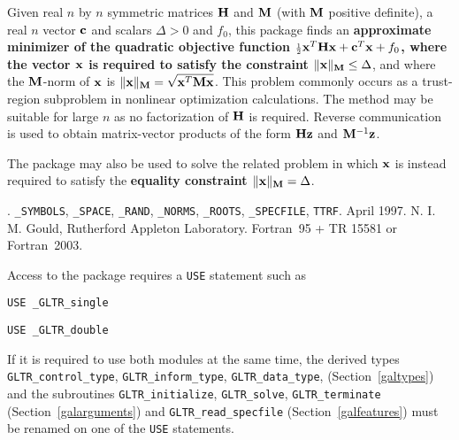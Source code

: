 \documentclass{galahad}
\newcommand{\packagename}{GL\-TR}
\newcommand{\fullpackagename}{\libraryname\_\packagename}
\begin{document}
\galheader


\galsummary
Given real $n$ by $n$ symmetric matrices ${\mathbf{H}}$ and ${\mathbf{M}}$
(with ${\mathbf{M}}$ positive definite), a real
$n$ vector ${\mathbf{c}}$ and scalars $\Delta>0$ and $f_0$, this package finds an
{\bf approximate minimizer of the quadratic objective function
${\scriptstyle \frac{1}{2}} {\mathbf{x}}^T {\mathbf{H}} {\mathbf{x}}  +  {\mathbf{c}}^T {\mathbf{x}} + f_0$, where the vector ${\mathbf{x}}$ is
required to satisfy the constraint $\|{\mathbf{x}}\|_{{\mathbf{M}}} \leq  \Delta$}, and
where the ${\mathbf{M}}$-norm of ${\mathbf{x}}$ is $\|{\mathbf{x}}\|_{{\mathbf{M}}} = \sqrt{{\mathbf{x}}^T {\mathbf{M}} {\mathbf{x}}}$.
This problem commonly occurs as a trust-region subproblem in nonlinear
optimization calculations.
The method may be suitable for large $n$ as no factorization of ${\mathbf{H}}$ is
required. Reverse communication is used to obtain
matrix-vector products of the form ${\mathbf{H}} {\mathbf{z}}$ and ${\mathbf{M}}^{-1} {\mathbf{z}}$.

\noindent
The package may also be used to solve the related problem in which ${\mathbf{x}}$ is
instead required to satisfy the
{\bf equality constraint $\|{\mathbf{x}}\|_{{\mathbf{M}}} = \Delta$}.


\galattributes
\galversions{\tt  \fullpackagename\_single, \fullpackagename\_double}.
\galuses
{\tt \libraryname\_SY\-M\-BOLS},
{\tt \libraryname\_SPACE}, {\tt \libraryname\_\-RAND},
{\tt \libraryname\_\-NORMS},
{\tt \libraryname\_ROOTS}, {\tt \libraryname\_SPECFILE},
{\tt *TTRF}.
\galdate April 1997.
\galorigin N. I. M. Gould, Rutherford Appleton Laboratory.
\gallanguage Fortran~95 + TR 15581 or Fortran~2003.


\galhowto

Access to the package requires a {\tt USE} statement such as

\medskip{}

\hskip0.5in {\tt USE \fullpackagename\_single}

\medskip{}

\hskip0.5in {\tt USE  \fullpackagename\_double}

\medskip

\noindent
If it is required to use both modules at the same time, the derived types
{\tt \packagename\_control\_type}, {\tt \packagename\_inform\_type},
{\tt \packagename\_data\_type},
(Section~\ref{galtypes})
and the subroutines
{\tt \packagename\_initialize},
{\tt \packagename\_solve}, {\tt \packagename\_terminate}
(Section~\ref{galarguments})
and
{\tt \packagename\_read\_specfile}
(Section~\ref{galfeatures})
must be renamed on one of the {\tt USE} statements.
\end{document}
